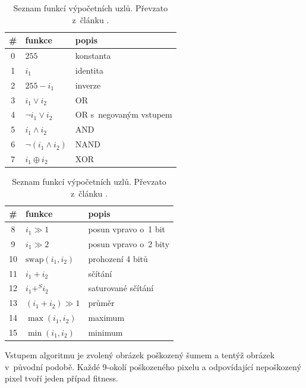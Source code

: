 \begin{table}[htb]
    \begin{minipage}[t]{.5\textwidth}
        \centering\begin{tabular}{|c|l|l|}
            \hline
            \# & funkce & popis \\
            \hline
            0 & $255$ & konstanta \\
            1 & $i_1$ & identita \\
            2 & $255 - i_1$ & inverze \\
            3 & $i_1 \vee i_2$ & OR \\
            4 & $\neg i_1 \vee i_2$ & OR s~negovaným vstupem \\
            5 & $i_1 \wedge i_2$ & AND \\
            6 & $\neg (i_1 \wedge i_2)$ & NAND \\
            7 & $i_1 \oplus i_2$ & XOR \\
            \hline
        \end{tabular}

    \end{minipage}
    \begin{minipage}[t]{.5\textwidth}
        \centering\begin{tabular}{|c|l|l|}
            \hline
            \# & funkce & popis \\
            \hline
            8 & $i_1 \gg 1$ & posun vpravo o~1 bit \\
            9 & $i_1 \gg 2$ & posun vpravo o~2 bity \\
            10 & $\mathrm{swap}(i_1, i_2)$ & prohození 4 bitů \\
            11 & $i_1 + i_2$ & sčítání \\
            12 & $i_1 +^S i_2$ & saturované sčítání \\
            13 & $(i_1 + i_2) \gg 1$ & průměr \\
            14 & $\max(i_1, i_2)$ & maximum \\
            15 & $\min(i_1, i_2)$ & minimum \\
            \hline
        \end{tabular}

    \end{minipage}
    \caption{Seznam funkcí výpočetních uzlů. Převzato z~článku \cite{SikuPPSN}.}
    \label{tabCGPFunctions}
\end{table}

Vstupem algoritmu je zvolený obrázek poškozený šumem a tentýž obrázek v~původní podobě. Každé 9-okolí poškozeného pixelu a odpovídající nepoškozený pixel tvoří jeden případ fitness.

